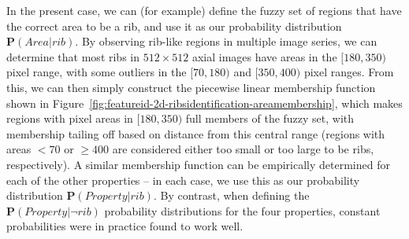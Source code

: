 In the present case, we can (for example) define the fuzzy set of regions that have the correct area to be a rib, and use it as our probability distribution $\mathbf{P}(\mathit{Area} | \mathit{rib})$. By observing rib-like regions in multiple image series, we can determine that most ribs in $512 \times 512$ axial images have areas in the $[180,350)$ pixel range, with some outliers in the $[70,180)$ and $[350,400)$ pixel ranges. From this, we can then simply construct the piecewise linear membership function shown in Figure~\ref{fig:featureid-2d-ribsidentification-areamembership}, which makes regions with pixel areas in $[180,350)$ full members of the fuzzy set, with membership tailing off based on distance from this central range (regions with areas $< 70$ or $\ge 400$ are considered either too small or too large to be ribs, respectively). A similar membership function can be empirically determined for each of the other properties -- in each case, we use this as our probability distribution $\mathbf{P}(\mathit{Property} | \mathit{rib})$. By contrast, when defining the $\mathbf{P}(\mathit{Property} | \neg\mathit{rib})$ probability distributions for the four properties, constant probabilities were in practice found to work well.


